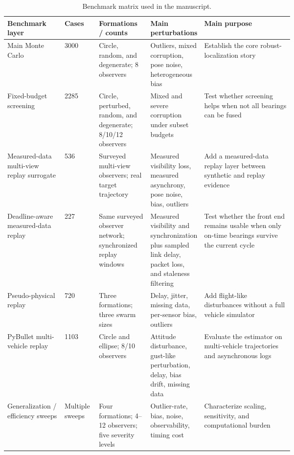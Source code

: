 \begin{table}[H]
\centering
\caption{Benchmark matrix used in the manuscript.}
\label{tab:benchmatrix}
\small
\begin{tabularx}{\linewidth}{Q{0.2\linewidth} Q{0.12\linewidth} Q{0.18\linewidth} Q{0.18\linewidth} Z}
\toprule
Benchmark layer & Cases & Formations / counts & Main perturbations & Main purpose \\
\midrule
Main Monte Carlo & 3000 & Circle, random, and degenerate; 8 observers & Outliers, mixed corruption, pose noise, heterogeneous bias & Establish the core robust-localization story \\
Fixed-budget screening & 2285 & Circle, perturbed, random, and degenerate; 8/10/12 observers & Mixed and severe corruption under subset budgets & Test whether screening helps when not all bearings can be fused \\
Measured-data multi-view replay surrogate & 536 & Surveyed multi-view observers; real target trajectory & Measured visibility loss, measured asynchrony, pose noise, bias, outliers & Add a measured-data replay layer between synthetic and replay evidence \\
Deadline-aware measured-data replay & 227 & Same surveyed observer network; synchronized replay windows & Measured visibility and synchronization plus sampled link delay, packet loss, and staleness filtering & Test whether the front end remains usable when only on-time bearings survive the current cycle \\
Pseudo-physical replay & 720 & Three formations; three swarm sizes & Delay, jitter, missing data, per-sensor bias, outliers & Add flight-like disturbances without a full vehicle simulator \\
PyBullet multi-vehicle replay & 1103 & Circle and ellipse; 8/10 observers & Attitude disturbance, gust-like perturbation, delay, bias drift, missing data & Evaluate the estimator on multi-vehicle trajectories and asynchronous logs \\
Generalization / efficiency sweeps & Multiple sweeps & Four formations; 4--12 observers; five severity levels & Outlier-rate, bias, noise, observability, timing cost & Characterize scaling, sensitivity, and computational burden \\
\bottomrule
\end{tabularx}
\end{table}

